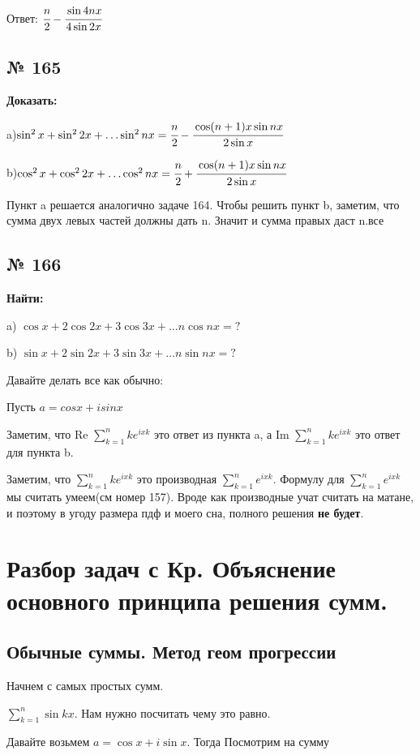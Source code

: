 \documentclass{article}
\begin{document}
Ответ: $\cfrac{n}{2}-\cfrac{\sin 4nx}{4\sin 2x}$

\pagebreak
\subsection{№ 165}

\textbf{Доказать:}

a)$\sin^2 x + \sin^2 2x + \ldots \sin^2nx = \cfrac{n}{2} - \cfrac{\cos(n+1)x \sin nx}{2\sin x}$

b)$\cos^2 x + \cos^2 2x + \ldots \cos^2nx = \cfrac{n}{2} + \cfrac{\cos(n+1)x \sin nx}{2\sin x}$

Пункт a решается аналогично задаче 164. Чтобы решить пункт b, заметим, что сумма двух левых частей должны дать n. Значит и сумма правых даст n.все
\pagebreak
\subsection{№ 166}

\textbf{Найти:}

a) $\cos x + 2 \cos 2x +3 \cos 3x + \ldots n\cos nx = ?$

b) $\sin x + 2 \sin 2x +3 \sin 3x + \ldots n\sin nx = ?$

Давайте делать все как обычно:

Пусть $a=cos x + isinx$

Заметим, что Re $\sum\limits_{k=1}^n ke^{ixk}$ это ответ из пункта a, а Im $\sum\limits_{k=1}^n ke^{ixk}$ это ответ для пункта b.

Заметим, что $\sum\limits_{k=1}^n ke^{ixk}$ это производная $\sum\limits_{k=1}^n e^{ixk}$. Формулу для $\sum\limits_{k=1}^n e^{ixk}$ мы считать умеем(см номер 157). Вроде как производные учат считать на матане, и поэтому в угоду размера пдф и моего сна, полного решения \textbf{не будет}.

\pagebreak
\section{Разбор задач с Кр. Объяснение основного принципа решения сумм.}

\subsection{Обычные суммы. Метод геом прогрессии}
Начнем с самых простых сумм.

$\sum\limits_{k=1}^n \sin kx$.  Нам нужно посчитать чему это равно.

Давайте возьмем $a = \cos x  + i\sin x$. Тогда Посмотрим на сумму
\end{document}
